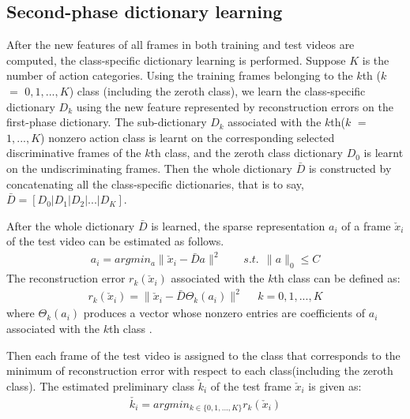 \documentclass{article}
\begin{document}
\subsection{Second-phase dictionary learning}
After the new features of all frames in both training and test videos are computed, the class-specific dictionary learning \cite{Wang20123902} is performed.
Suppose $K$ is the number of action categories.
Using the training frames belonging to the $k$th ($k$ $=$ $0,1,...,K$) class (including the zeroth class), we learn the class-specific dictionary $D_{k}$ using the new feature represented by reconstruction errors on the first-phase dictionary.
The sub-dictionary $D_{k}$ associated with the $k$th($k$ $=$ $1,...,K$) nonzero action class is learnt on the corresponding selected discriminative frames of the $k$th class, and the zeroth class dictionary $D_{0}$ is learnt on the undiscriminating frames.
Then the whole dictionary $\bar{D}$ is constructed by concatenating all the class-specific dictionaries, that is to say, $\bar{D}=[D_{0}|D_{1}| D_{2} |...| D_{K}]$.


After the whole dictionary $\bar{D}$ is learned, the sparse representation $a_{i}$ of a  frame  $\check{x}_{i}$ of the test video can be estimated as follows.
\begin{equation} \label{eq5}
 \begin{aligned}
a_{i}=argmin_{a}    \|\check{x}_{i}-\bar{D}a\|^{2}   \ \ \ \ \ \ \ \ \  s.t.  \ \   \|a\|_{0} \leq C
 \end{aligned}
\end{equation}
The reconstruction error $r_{k}(\check{x}_{i})$ associated with the $k$th class can be defined as:
 \begin{equation} \label{eq5}
 \begin{aligned}
r_{k}(\check{x}_{i})=\|\check{x}_{i}-\bar{D}\Theta_{k}(a_{i})\|^{2}   \ \ \ \ \ \ k=0,1,...,K
 \end{aligned}
\end{equation}
where $\Theta_{k}(a_{i})$ produces a vector whose nonzero entries are coefficients of $a_{i}$  associated with the $k$th class .

Then each frame of the test video is assigned to the class that corresponds to
the minimum of reconstruction error with respect to each class(including the zeroth class).
The estimated preliminary class  $\check{k}_i$ of the test frame $\check{x}_{i}$ is given as:
 \begin{equation} \label{eq5}
 \begin{aligned}
\check{k_i}=argmin_{k\in \{0,1,...,K\}} r_{k}(\check{x}_{i})
\end{aligned}
\end{equation}
\end{document}

